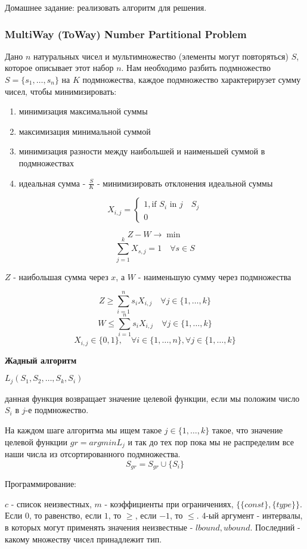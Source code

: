 \documentclass[%
10pt, %
final, %
oneside, %
onecolumn, %
centertags]{article} %
\theoremstyle{plain}
\theoremstyle{definition}
\theoremstyle{remark}
\begin{document}
Домашнее задание: реализовать алгоритм для решения.

\subsubsection{MultiWay (ToWay) Number Partitional Problem}

Дано $n$ натуральных чисел и мультимножество (элементы могут повторяться) $S$, которое описывает этот набор $n$. Нам необходимо разбить подмножество $S=\{s_1,\ldots,s_n\}$ на $K$ подмножества, каждое подмножество характерирузет сумму чисел, чтобы минимизировать:
\begin{enumerate}
	\item минимизация максимальной суммы
	\item максимизация минимальной суммой
	\item минимизация разности между наибольшей и наименьшей суммой в подмножествах
	\item идеальная сумма - $\frac{S}{K}$ - минимизировать отклонения идеальной суммы
\end{enumerate}

$$X_{i,j} = \begin{cases}
	1, \text{if } S_i \text{ in } j \quad S_j \\
	0
\end{cases}$$

$$Z-W \to \min$$
$$\sum\limits_{j=1}^k X_{s,j}=1 \quad \forall s \in S$$

$Z$ - наибольшая сумма через $x$, а $W$ - наименьшую сумму через подмножества

$$Z \geq \sum\limits_{i=1}^n s_i X_{i,j} \quad \forall j \in \{1,\ldots,k\}$$
$$W \leq \sum\limits_{i=1}^n s_i X_{i,j} \quad \forall j \in \{1,\ldots,k\}$$
$$X_{i,j} \in \{0,1\}, \quad \forall i \in \{1,\ldots,n\}, \forall j \in \{1,\ldots,k\}$$

\textbf{Жадный алгоритм}

$L_j (S_1,S_2,\ldots,S_k,S_i)$

данная функция возвращает значение целевой функции, если мы положим число $S_i$ в $j$-е подмножество.

На каждом шаге алгоритма мы ищем такое $j \in \{1,\ldots,k\}$ такое, что значение целевой функции $gr = argmin L_j$ и так до тех пор пока мы не распределим все наши числа из отсортированного подмножества.
$$S_{gr} = S_{gr} \cup \{S_i\}$$

Программирование:

$c$ - список неизвестных, $m$ - коэффициенты при ограничениях, $\{\{const\},\{type\}\}$. Если $0$, то равенство, если $1$, то $\geq$, если $-1$, то $\leq$. 4-ый аргумент - интервалы, в которых могут применять значения неизвестные - $lbound, ubound$. Последний - какому множеству чисел принадлежит тип.
\end{document}
